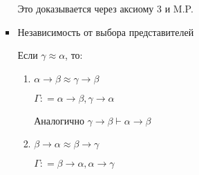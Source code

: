 \begin{enumerate}
\begin{enumerate}[wide, labelwidth=!, labelindent=0pt]
\begin{itemize}
                              Это доказывается через аксиому 3 и M.P.
                        \item Независимость от выбора представителей

                              Если \(\gamma \approx \alpha\), то:
                              \begin{enumerate}
                                  \item \(\alpha \to \beta \approx \gamma \to \beta\)

                                        \(\Gamma : = \alpha \to \beta, \gamma \to \alpha\)

                                        \begin{prooftree}
                                        \end{prooftree}


                                        Аналогично \(\gamma \to \beta \vdash \alpha \to \beta\)

                                  \item \(\beta \to \alpha \approx \beta \to \gamma\)

                                        \(\Gamma : = \beta \to \alpha, \alpha \to \gamma\)


\end{enumerate}
\end{itemize}
\end{enumerate}
\end{enumerate}
